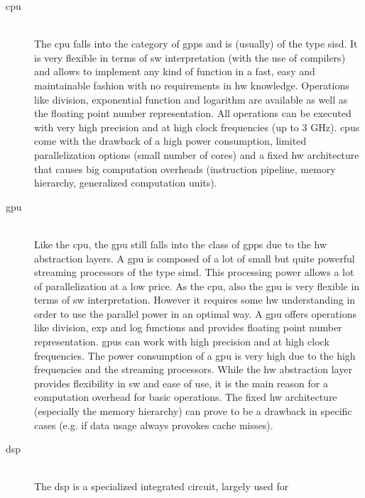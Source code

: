 \documentclass[mscthesis]{usiinfthesis}
\begin{document}
\begin{description}
    \item[\acrshort{cpu}] \hfill \\
        The \acrfull{cpu} falls into the category of \glspl{gpp} and is
        (usually) of the type \gls{sisd}. It is very flexible in terms of
        \gls{sw} interpretation (with the use of compilers) and allows to
        implement any kind of function in a fast, easy and maintainable fashion
        with no requirements in \gls{hw} knowledge. Operations like division,
        exponential function and logarithm are available as well as the
        floating point number representation. All operations can be executed
        with very high precision and at high clock frequencies (up to 3 GHz).
        \glspl{cpu} come with the drawback of a high power consumption, limited
        parallelization options (small number of cores) and a fixed \gls{hw}
        architecture that causes big computation overheads (instruction
        pipeline, memory hierarchy, generalized computation units).
    \item[\acrshort{gpu}] \hfill \\
        Like the \gls{cpu}, the \acrfull{gpu} still falls into the class of
        \glspl{gpp} due to the \gls{hw} abstraction layers. A \gls{gpu} is
        composed of a lot of small but quite powerful streaming processors of
        the type \gls{simd}. This processing power allows a lot of
        parallelization at a low price. As the \gls{cpu}, also the \gls{gpu} is
        very flexible in terms of \gls{sw} interpretation. However it requires
        some \gls{hw} understanding in order to use the parallel power in an
        optimal way. A \gls{gpu} offers operations like division, exp and log
        functions and provides floating point number representation.
        \glspl{gpu} can work with high precision and at high clock frequencies.
        The power consumption of a \gls{gpu} is very high due to the high
        frequencies and the streaming processors. While the \gls{hw}
        abstraction layer provides flexibility in \gls{sw} and ease of use, it
        is the main reason for a computation overhead for basic operations. The
        fixed \gls{hw} architecture (especially the memory hierarchy) can prove
        to be a drawback in specific cases (e.g. if data usage always provokes
        cache misses).
    \item[\acrshort{dsp}] \hfill \\
        The \acrfull{dsp} is a specialized integrated circuit, largely used for

\end{description}
\end{document}
